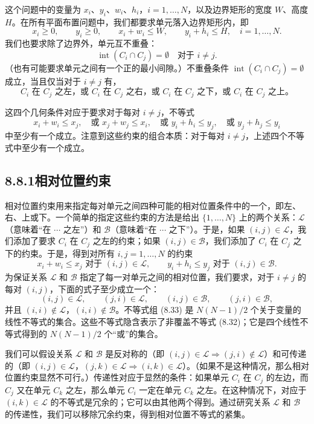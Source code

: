 \documentclass[UTF8,12pt,a4paper,fontset=fandol]{ctexart}
\begin{document}
这个问题中的变量为 $x_i$、$y_i$、$w_i$、$h_i$，$i=1,\ldots,N$，以及边界矩形的宽度 $W$、高度 $H$。在所有平面布置问题中，我们都要求单元落入边界矩形内，即
\[
x_i\geq 0,\qquad y_i\geq 0,\qquad x_i+w_i\leq W,\qquad y_i+h_i\leq H,\quad i=1,\ldots,N.
\tag{8.31}
\]
我们也要求除了边界外，单元互不重叠：
\[
\operatorname{int}(C_i\cap C_j)=\emptyset \quad \mbox{对于 } i\neq j.
\]
（也有可能要求单元之间有一个正的最小间隙。）不重叠条件 $\operatorname{int}(C_i\cap C_j)=\emptyset$ 成立，当且仅当对于 $i\neq j$ 有，
\[
C_i\mbox{ 在 }C_j\mbox{ 之左，或 }C_i\mbox{ 在 }C_j\mbox{ 之右，或 }C_i\mbox{ 在 }C_j\mbox{ 之下，或 }C_i\mbox{ 在 }C_j\mbox{ 之上。}
\]

这四个几何条件对应于要求对于每对 $i\neq j$，不等式
\[
x_i+w_i\leq x_j,\quad \mbox{或 } x_j+w_j\leq x_i,\quad \mbox{或 } y_i+h_i\leq y_j,\quad \mbox{或 } y_j+h_j\leq y_i
\tag{8.32}
\]
中至少有一个成立。注意到这些约束的组合本质：对于每对 $i\neq j$，上述四个不等式中至少有一个成立。

\subsection*{8.8.1\quad 相对位置约束}

相对位置约束用来指定每对单元之间四种可能的相对位置条件中的一个，即左、右、上或下。一个简单的指定这些约束的方法是给出 $\{1,\ldots,N\}$ 上的两个关系：$\mathcal L$（意味着“在 $\cdots$ 之左”）和 $\mathcal B$（意味着“在 $\cdots$ 之下”）。于是，如果 $(i,j)\in\mathcal L$，我们添加了要求 $C_i$ 在 $C_j$ 之左的约束；如果 $(i,j)\in\mathcal B$，我们添加了 $C_i$ 在 $C_j$ 之下的约束。于是，得到对所有 $i,j=1,\ldots,N$ 的约束
\[
x_i+w_i\leq x_j \mbox{ 对于 } (i,j)\in\mathcal L,\qquad
y_i+h_i\leq y_j \mbox{ 对于 } (i,j)\in\mathcal B.
\tag{8.33}
\]
为保证关系 $\mathcal L$ 和 $\mathcal B$ 指定了每一对单元之间的相对位置，我们要求，对于 $i\neq j$ 的每对 $(i,j)$，下面的式子至少成立一个：
\[
(i,j)\in\mathcal L,\qquad (j,i)\in\mathcal L,\qquad (i,j)\in\mathcal B,\qquad (j,i)\in\mathcal B,
\]
并且 $(i,i)\notin\mathcal L$，$(i,i)\notin\mathcal B$。不等式组 (8.33) 是 $N(N-1)/2$ 个关于变量的线性不等式的集合。这些不等式隐含表示了非覆盖不等式 (8.32)；它是四个线性不等式得到的 $N(N-1)/2$ 个“或”的集合。

我们可以假设关系 $\mathcal L$ 和 $\mathcal B$ 是反对称的（即 $(i,j)\in\mathcal L\Rightarrow (j,i)\notin\mathcal L$）和可传递的（即 $(i,j)\in\mathcal L$，$(j,k)\in\mathcal L\Rightarrow (i,k)\in\mathcal L$）。（如果不是这种情况，那么相对位置约束显然不可行。）传递性对应于显然的条件：如果单元 $C_i$ 在 $C_j$ 的左边，而 $C_j$ 又在单元 $C_k$ 之左，那么单元 $C_i$ 一定在单元 $C_k$ 之左。在这种情况下，对应于 $(i,k)\in\mathcal L$ 的不等式是冗余的；它可以由其他两个得到。通过研究关系 $\mathcal L$ 和 $\mathcal B$ 的传递性，我们可以移除冗余约束，得到相对位置不等式的紧集。
\end{document}
